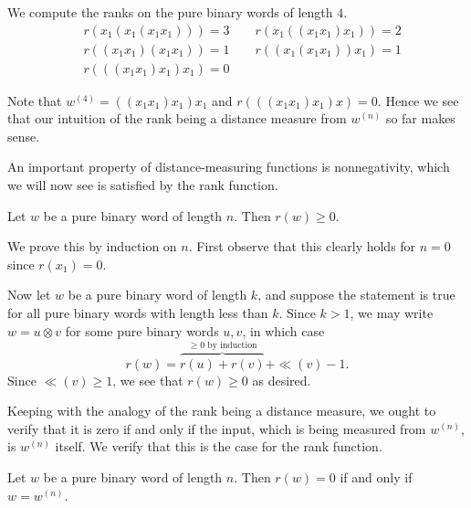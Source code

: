 \begin{example}
    We compute the ranks on the pure binary words of length $4$.
    \begin{align*}
        &r(x_1(x_1(x_1x_1))) =3
        \qquad r(x_1((x_1x_1)x_1)) =2\\
        &r((x_1x_1)(x_1x_1)) =1
        \qquad r((x_1(x_1x_1))x_1) =1\\
        &r(((x_1x_1)x_1)x_1) =0
    \end{align*}
\end{example}

Note that $w^{(4)} = ((x_1x_1)x_1)x_1$ and $r(((x_1x_1)x_1)x) = 0$. 
Hence we see that our intuition of the rank being a distance measure 
from $w^{(n)}$ so far makes sense. 

An important property of distance-measuring 
functions is nonnegativity, which we will now see is satisfied by 
the rank function.

\begin{lemma}\label{lemma:rank_is_positive}
    Let $w$ be a pure binary word of length $n$. Then $r(w) \ge 0$. 
\end{lemma}

\begin{prf}
    We prove this by induction on $n$.
    First observe that this clearly holds for $n = 0$ since $r(x_1) = 0$. 

    Now let $w$ be a pure binary word of length $k$, and suppose the 
    statement is true for all pure binary words with length less than $k$.
    Since $k > 1$, we may write $w = u \otimes v$ for some pure binary words 
    $u,v$, in which case 
    \[
        r(w) =  \overbrace{r(u) + r(v)}^{\ge 0 \text{ by induction}}
         + \ll(v) -1.
    \]
    Since $\ll(v) \ge 1$, we see that $r(w) \ge 0$ as desired.
\end{prf}

Keeping with the analogy of the rank being a distance measure, we ought 
to verify that it is zero if and only if the input, which is being measured from 
$w^{(n)}$, is $w^{(n)}$ itself. We verify that this is the case for the rank function.

\begin{proposition}\label{proposition:rank_is_zero}
    Let $w$ be a pure binary word of length $n$. 
    Then $r(w) = 0$ if and only if $w = w^{(n)}$.
\end{proposition}

